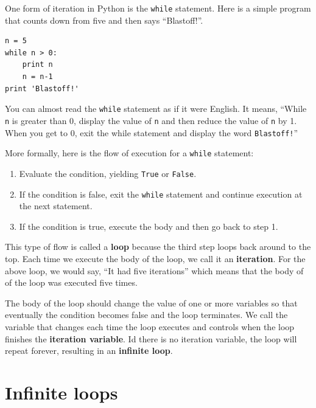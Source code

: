 \documentclass[10pt]{book}
\begin{document}
One form of iteration in Python is the {\tt while} statement.  Here is 
a simple program that counts down from five and then says ``Blastoff!''.

\beforeverb
\begin{verbatim}
n = 5
while n > 0:
    print n
    n = n-1
print 'Blastoff!'
\end{verbatim}
\afterverb
%
You can almost read the {\tt while} statement as if it were English.
It means, ``While {\tt n} is greater than 0,
display the value of {\tt n} and then reduce the value of
{\tt n} by 1.  When you get to 0, exit the while statement and
display the word {\tt Blastoff!}''


More formally, here is the flow of execution for a {\tt while} statement:

\begin{enumerate}

\item Evaluate the condition, yielding {\tt True} or {\tt False}.

\item If the condition is false, exit the {\tt while} statement
and continue execution at the next statement.

\item If the condition is true, execute the
body and then go back to step 1.

\end{enumerate}

This type of flow is called a {\bf loop} because the third step
loops back around to the top.  Each time we execute the body of 
the loop, we call it an {\bf iteration}.  For the above loop, we 
would say, ``It had five iterations'' which means that the body of
of the loop was executed five times.


The body of the loop should change the value of one or more variables
so that eventually the condition becomes false and the loop
terminates.  
We call the variable that changes each time the loop
executes and controls when the loop finishes the 
{\bf iteration variable}.
Id there is no iteration variable, the loop will repeat forever, 
resulting in an {\bf infinite loop}.  

\section{Infinite loops}
\end{document}
